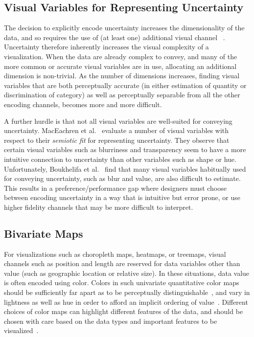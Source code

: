 \documentclass{vgtc}                          %
\begin{document}
\subsection{Visual Variables for Representing Uncertainty}

The decision to explicitly encode uncertainty increases the dimensionality of the data, and so requires the use of (at least one) additional visual channel ~\cite{brodlie2012review}. Uncertainty therefore inherently increases the visual complexity of a visualization. When the data are already complex to convey, and many of the more common or accurate visual variables are in use, allocating an additional dimension is non-trivial. As the number of dimensions increases, finding visual variables that are both perceptually accurate (in either estimation of quantity or discrimination of category) as well as perceptually separable from all the other encoding channels, becomes more and more difficult.

A further hurdle is that not all visual variables are well-suited for conveying uncertainty. MacEachren et al.~\cite{maceachren2012visual} evaluate a number of visual variables with respect to their \emph{semiotic fit} for representing uncertainty. They observe that certain visual variables such as blurriness and transparency seem to have a more intuitive connection to uncertainty than other variables such as shape or hue. Unfortunately, Boukhelifa et al.~\cite{boukhelifa2012evaluating} find that many visual variables habitually used for conveying uncertainty, such as blur and value, are also difficult to estimate. This results in a preference/performance gap where designers must choose between encoding uncertainty in a way that is intuitive but error prone, or use higher fidelity channels that may be more difficult to interpret.

\subsection{Bivariate Maps}

For visualizations such as choropleth maps, heatmaps, or treemaps, visual channels such as position and length are reserved for data variables other than value (such as geographic location or relative size). In these situations, data value is often encoded using color. Colors in such univariate quantitative color maps should be sufficiently far apart as to be perceptually distinguishable~\cite{ware1988color}, and vary in lightness as well as hue in order to afford an implicit ordering of value~\cite{borland2007rainbow,rogowitz2001blair}. Different choices of color maps can highlight different features of the data, and should be chosen with care based on the data types and important features to be visualized~\cite{rogowitz1996not}.
\end{document}
